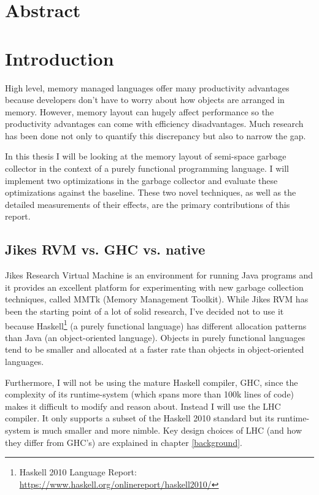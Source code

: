 \documentclass[a4paper,oneside]{memoir}
\begin{document}


\chapter*{Abstract}



\newpage

\tableofcontents*

\chapter{Introduction}
High level, memory managed languages offer many productivity advantages because
developers don't have to worry about how objects are arranged in memory. However,
memory layout can hugely affect performance so the productivity advantages can
come with efficiency disadvantages. Much research has been done not only to
quantify this discrepancy but also to narrow the gap.

In this thesis I will be looking at the memory layout of semi-space garbage
collector in the context of a purely functional programming language.
I will implement two optimizations in the garbage collector and evaluate these
optimizations against the baseline. These two novel techniques, as well as the
detailed measurements of their effects, are the primary contributions of this
report.

\section{Jikes RVM vs. GHC vs. native}

Jikes Research Virtual Machine is an environment for running Java programs
and it provides an excellent platform for experimenting with new garbage
collection techniques, called MMTk (Memory Management Toolkit).\cite{Blackburn:2004}
While Jikes RVM has been the starting point of a lot of solid research, I've
decided not to use it because
Haskell\footnote{Haskell 2010 Language Report: \url{https://www.haskell.org/onlinereport/haskell2010/}}
 (a purely functional language) has
different allocation patterns than Java (an object-oriented language).
\cite{Novark:2006,Blackburn:2008,Hertz:2005,mc2}
Objects in purely functional languages tend to be smaller and allocated at a
faster rate than objects in object-oriented languages.

Furthermore, I will not be using the mature Haskell compiler, GHC, since the
complexity of its runtime-system (which spans more than 100k lines of code)
makes it difficult to modify and reason about. Instead I will use the LHC
compiler. It only supports a subset of the Haskell 2010 standard but its
runtime-system is much smaller and more nimble. Key design choices of
LHC (and how they differ from GHC's) are explained in chapter \ref{background}.
\end{document}
